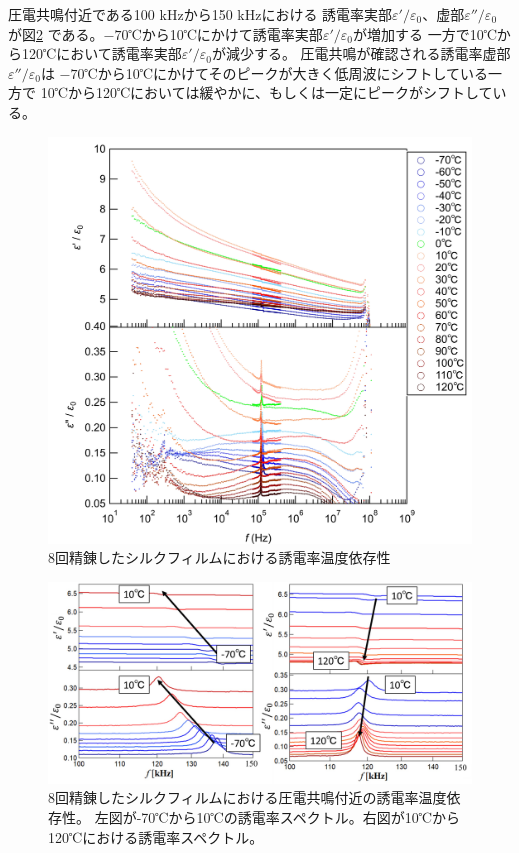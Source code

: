 \documentclass[dvipdfmx,12pt,a4paper]{jreport}
\begin{document}
			圧電共鳴付近である100 kHzから150 kHzにおける
			誘電率実部$\varepsilon'/\varepsilon_0$、虚部$\varepsilon''/\varepsilon_0$
			が図\ref{8回誘電率温度依存性_拡大図}
			である。$-70$℃から10℃にかけて誘電率実部$\varepsilon'/\varepsilon_0$が増加する
			一方で10℃から120℃において誘電率実部$\varepsilon'/\varepsilon_0$が減少する。
			圧電共鳴が確認される誘電率虚部$\varepsilon''/\varepsilon_0$は
			$-70$℃から10℃にかけてそのピークが大きく低周波にシフトしている一方で
			10℃から120℃においては緩やかに、もしくは一定にピークがシフトしている。
			\begin{figure}[H]
				\centering
				\includegraphics[width=\linewidth]{8回_誘電率温度依存性.jpg}
				\caption{8回精錬したシルクフィルムにおける誘電率温度依存性}
				\label{8回誘電率温度依存性}
			\end{figure}
			\newpage
			\begin{figure}[h]
				\centering
				\includegraphics[width=\linewidth]{8回_誘電率温度依存性_共鳴付近.jpg}
				\caption{8回精錬したシルクフィルムにおける圧電共鳴付近の誘電率温度依存性。
				左図が-70℃から10℃の誘電率スペクトル。右図が10℃から120℃における誘電率スペクトル。}
				\label{8回誘電率温度依存性_拡大図}
			\end{figure}
\end{document}
